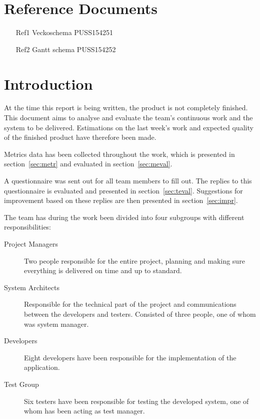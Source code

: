 \documentclass[a4paper]{article}
\begin{document}
\section{Reference Documents}
\begin{enumerate}

\item[Ref1] Veckoschema PUSS154251

\item[Ref2] Gantt schema PUSS154252 

\end{enumerate}


\section{Introduction}
At the time this report is being written, the product is not completely finished. This document aims to analyse and evaluate the team's continuous work and the system to be delivered. Estimations on the last week's work and expected quality of the finished product have therefore been made. 

Metrics data has been collected throughout the work, which is presented in section~\ref{sec:metr} and evaluated in section~\ref{sec:meval}.

A questionnaire was sent out for all team members to fill out. The replies to this questionnaire is evaluated and presented in section~\ref{sec:teval}. Suggestions for improvement based on these replies are then presented in section~\ref{sec:impr}.

The team has during the work been divided into four subgroups with different responsibilities:

\begin{description}
\item[Project Managers] Two people responsible for the entire project, planning and making sure everything is delivered on time and up to standard.
\item[System Architects] Responsible for the technical part of the project and communications between the developers and testers. Consisted of three people, one of whom was system manager.
\item[Developers] Eight developers have been responsible for the implementation of the application.
\item[Test Group] Six testers have been responsible for testing the developed system, one of whom has been acting as test manager.
\end{description}
\end{document}

